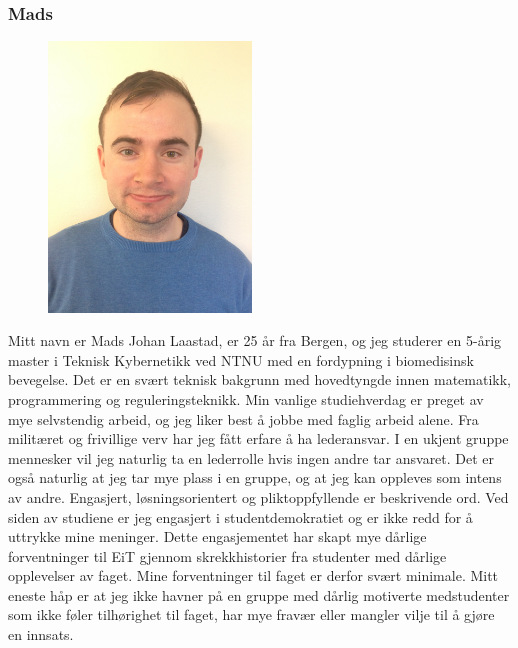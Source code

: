 \subsubsection{Mads}
\begin{figure}
  \vspace{-20pt}
  \begin{center}
    \includegraphics[scale= 0.02, angle = 270, width=0.48\textwidth]{img_mads.JPG}
  \end{center}
  \vspace{-20pt}
  \vspace{-10pt}
\end{figure}
Mitt navn er Mads Johan Laastad, er 25 år fra Bergen, og jeg studerer en 5-årig master i Teknisk Kybernetikk ved NTNU med en fordypning i biomedisinsk bevegelse. Det er en svært teknisk bakgrunn med hovedtyngde innen matematikk, programmering og reguleringsteknikk. Min vanlige studiehverdag er preget av mye selvstendig arbeid, og jeg liker best å jobbe med faglig arbeid alene. Fra militæret og frivillige verv har jeg fått erfare å ha lederansvar. I en ukjent gruppe mennesker vil jeg naturlig ta en lederrolle hvis ingen andre tar ansvaret. Det er også naturlig at jeg tar mye plass i en gruppe, og at jeg kan oppleves som intens av andre. Engasjert, løsningsorientert og pliktoppfyllende er beskrivende ord. Ved siden av studiene er jeg engasjert i studentdemokratiet og er ikke redd for å uttrykke mine meninger. Dette engasjementet har skapt mye dårlige forventninger til EiT gjennom skrekkhistorier fra studenter med dårlige opplevelser av faget. Mine forventninger til faget er derfor svært minimale. Mitt eneste håp er at jeg ikke havner på en gruppe med dårlig motiverte medstudenter som ikke føler tilhørighet til faget, har mye fravær eller mangler vilje til å gjøre en innsats. 

